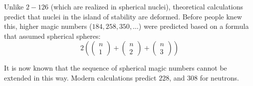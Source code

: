 \documentclass{article}
\begin{document}
\begin{multicols*}{2}
    Unlike $2-126$ (which are realized in spherical nuclei), theoretical calculations
    predict that nuclei in the island of stability are deformed. Before people knew this,
    higher magic numbers ($184, 258, 350, \ldots$) were predicted based on a formula
    that assumed spherical spheres:
    \[
      2\left(\begin{pmatrix}n\\ 1\end{pmatrix} + \begin{pmatrix}n\\ 2\end{pmatrix} + \begin{pmatrix}n\\ 3\end{pmatrix}\right)
    \]
    
    It is now known that the sequence of spherical magic numbers cannot be extended in this
    way. Modern calculations predict $228$, and $308$ for neutrons.

  \end{multicols*}
\end{document}
